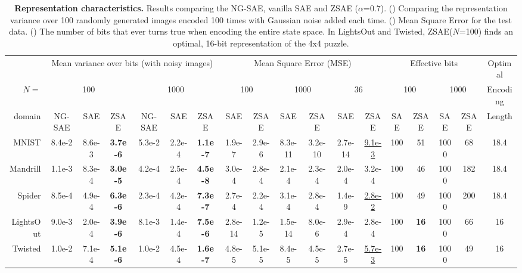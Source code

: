 \begin{table}[tbp]
 \centering
 \begin{adjustbox}{width={\linewidth},keepaspectratio}
 \begin{tabular}{|r|*{17}{c|}}
       & \multicolumn{6}{c|}{Mean variance over bits (with noisy images)}
       & \multicolumn{6}{c|}{Mean Square Error (MSE)}
       & \multicolumn{4}{c|}{Effective bits}
       & Optimal
  \\
$N=$ & \multicolumn{3}{c|}{100} & \multicolumn{3}{c|}{1000}
     & \multicolumn{2}{c|}{100} & \multicolumn{2}{c|}{1000} & \multicolumn{2}{c|}{36}
     & \multicolumn{2}{c|}{100} & \multicolumn{2}{c|}{1000}
  & Encoding
  \\
domain    & NG-SAE & SAE    & ZSAE            & NG-SAE & SAE    & ZSAE            & SAE     & ZSAE  & SAE    & ZSAE   & SAE    & ZSAE          & SAE & ZSAE        & SAE  & ZSAE & Length \\ 
MNIST     & 8.4e-2 & 8.6e-3 & \textbf{3.7e-6} & 5.3e-2 & 2.2e-4 & \textbf{1.1e-7} & 1.9e-7  &2.9e-6 &8.3e-11 &3.2e-10 &2.7e-14 &\uline{9.1e-3} & 100 & 51          & 1000 & 68   & 18.4   \\ 
Mandrill  & 1.1e-3 & 8.3e-4 & \textbf{3.0e-5} & 4.2e-4 & 2.5e-4 & \textbf{4.5e-8} & 3.0e-4  &2.8e-4 &2.1e-4  &2.3e-4  &2.0e-4  &{3.2e-4}       & 100 & 46          & 1000 & 182  & 18.4   \\ 
Spider    & 8.5e-4 & 4.9e-4 & \textbf{6.3e-6} & 2.3e-4 & 4.2e-4 & \textbf{7.3e-7} & 2.7e-4  &2.2e-4 &3.1e-4  &2.8e-4  &1.4e-9  &\uline{2.8e-2} & 100 & 49          & 1000 & 200  & 18.4   \\ 
LightsOut & 9.0e-3 & 2.0e-4 & \textbf{3.9e-6} & 8.1e-3 & 1.4e-4 & \textbf{7.5e-6} & 2.8e-14 &1.2e-5 &1.5e-14 &8.0e-6  &2.9e-4  &{2.8e-4}       & 100 & \textbf{16} & 1000 & 66   & 16     \\ 
Twisted   & 1.0e-2 & 7.1e-4 & \textbf{5.1e-6} & 1.0e-2 & 4.5e-4 & \textbf{1.6e-7} & 4.8e-5  &5.1e-5 &8.4e-5  &4.5e-5  &2.7e-5  &\uline{5.7e-3} & 100 & \textbf{16} & 1000 & 49   & 16     \\ 
\end{tabular}
\end{adjustbox}
 \caption{\textbf{Representation characteristics.}
Results comparing the NG-SAE, vanilla SAE and ZSAE ($\alpha$=0.7).
() Comparing the representation variance over 100 randomly generated images encoded 100 times with Gaussian noise added each time.
() Mean Square Error for the test data.
() The number of bits that ever turns true when encoding the entire state space.
 In LightsOut and Twisted, ZSAE($N$=100) finds an optimal, 16-bit representation of the 4x4 puzzle.
 }
\label{tab:stability}
\end{table}

